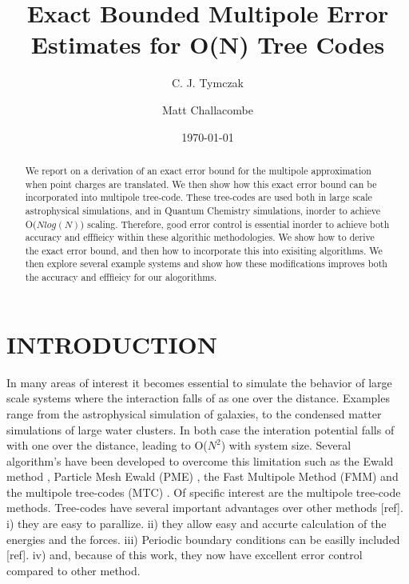\documentclass[prb,aps,nobibnotes,superbib,preprint]{revtex4}
\begin{document}
\title{\textbf{Exact Bounded Multipole Error Estimates for O(N) Tree Codes}}

\author{C. J. Tymczak}
\author{Matt Challacombe}


\date{\today}

\begin{abstract}
We report on a derivation of an exact error bound for the multipole approximation when point 
charges are translated. We then show how this exact error bound can be incorporated into
multipole tree-code. These tree-codes are used both in large scale astrophysical 
simulations, and in Quantum Chemistry simulations, inorder to achieve {\cal O}($N log(N)$) 
scaling. Therefore, good error control is essential inorder to achieve both 
accuracy and efffieicy within these algorithic methodologies. We show how to derive the
exact error bound, and then how to incorporate this into exisiting algorithms. We then explore 
several example systems and show how these modifications improves both the accuracy and efffieicy 
for our alogorithms.
\end{abstract}


\maketitle

\section{INTRODUCTION}

In many areas of interest it becomes essential to simulate 
the behavior of large scale systems where the interaction 
falls of as one over the distance. Examples range from  the astrophysical simulation
of galaxies, to the condensed matter simulations of large water clusters. 
In both case the interation potential falls of with one over the distance, 
leading to  {\cal O}($N^2$) with system size. Several algorithm's have been developed to
overcome this limitation such as the Ewald method \cite{DFincham94}, 
Particle Mesh Ewald (PME) \cite{luty:94}, 
the Fast Multipole Method (FMM) \cite{Singh93,shimada:94,singer:95a}
and the multipole tree-codes (MTC) \cite{Salmon94}. 
Of specific interest are the multipole tree-code methods. 
Tree-codes have several important advantages over other methods [ref]. i) they are easy to parallize.
ii) they allow easy and accurte calculation of the energies and the forces. iii) Periodic boundary
conditions can be easilly included [ref]. iv) and, because of this work, they
now have excellent error control compared to other method.
\end{document}
